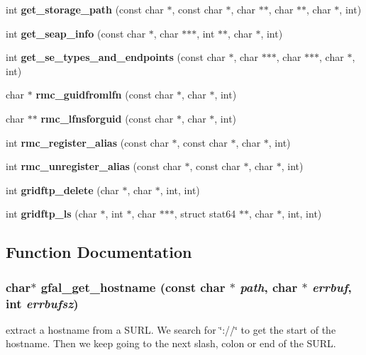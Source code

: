 \begin{CompactItemize}
\item 
int \textbf{get\_\-storage\_\-path} (const char $\ast$, const char $\ast$, char $\ast$$\ast$, char $\ast$$\ast$, char $\ast$, int)\label{group__internal__group_g17d2b87d75003d27590884b57f264314}

\item 
int \textbf{get\_\-seap\_\-info} (const char $\ast$, char $\ast$$\ast$$\ast$, int $\ast$$\ast$, char $\ast$, int)\label{group__internal__group_g56daac54672781b617cee8813fc0e1c9}

\item 
int \textbf{get\_\-se\_\-types\_\-and\_\-endpoints} (const char $\ast$, char $\ast$$\ast$$\ast$, char $\ast$$\ast$$\ast$, char $\ast$, int)\label{group__internal__group_gf53006a28540ccc70306d72903ab4802}

\item 
char $\ast$ \textbf{rmc\_\-guidfromlfn} (const char $\ast$, char $\ast$, int)\label{group__internal__group_g83a423ba6bb37eda1d1e9fe70cefeea0}

\item 
char $\ast$$\ast$ \textbf{rmc\_\-lfnsforguid} (const char $\ast$, char $\ast$, int)\label{group__internal__group_g7311bb7aa4f897ebf7f91bbb55c81d5b}

\item 
int \textbf{rmc\_\-register\_\-alias} (const char $\ast$, const char $\ast$, char $\ast$, int)\label{group__internal__group_g726824240cad440eb7a60259b9468a40}

\item 
int \textbf{rmc\_\-unregister\_\-alias} (const char $\ast$, const char $\ast$, char $\ast$, int)\label{group__internal__group_g3da248a6139d1cab4b4432793b2df115}

\item 
int \textbf{gridftp\_\-delete} (char $\ast$, char $\ast$, int, int)\label{group__internal__group_g227bf30b43a3fb3ba58d280c4669d558}

\item 
int \textbf{gridftp\_\-ls} (char $\ast$, int $\ast$, char $\ast$$\ast$$\ast$, struct stat64 $\ast$$\ast$, char $\ast$, int, int)\label{group__internal__group_g4c8a3503515b82f59509d89a4a858c9f}

\end{CompactItemize}


\subsection{Function Documentation}
\subsubsection{\setlength{\rightskip}{0pt plus 5cm}char$\ast$ gfal\_\-get\_\-hostname (const char $\ast$ {\em path}, char $\ast$ {\em errbuf}, int {\em errbufsz})}\label{group__internal__group_gfbe1d2da151f9bd6a0ab1ec1abf0ac81}


extract a hostname from a SURL. We search for \char`\"{}://\char`\"{} to get the start of the hostname. Then we keep going to the next slash, colon or end of the SURL. 